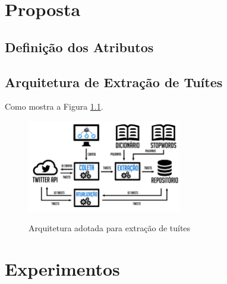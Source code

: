 \documentclass[oneside,openright,12pt]{ufsm_2015} %
\begin{document}

\chapter{Proposta}
\label{sec:proposta}


\section{Definição dos Atributos}
\label{sec:def-atributos}


\section{Arquitetura de Extração de Tuítes}
\label{sec:arq-extracao}

\par Como mostra a Figura \ref{fig:arquitetura}.

\begin{figure}[ht]
     \caption{Arquitetura adotada para extração de tuítes}
\centering
\includegraphics[width=0.6\textwidth]{figuras/arquitetura.png}
\vspace{\baselineskip} %
\label{fig:arquitetura}
\end{figure}



\chapter{Experimentos}
\label{sec:experimentos}
\end{document}
